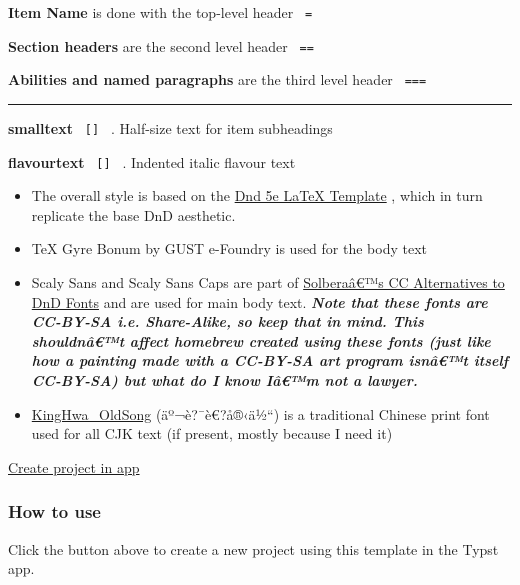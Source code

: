 \textbf{Item Name} is done with the top-level header \texttt{\ =\ }

\textbf{Section headers} are the second level header \texttt{\ ==\ }

\textbf{Abilities and named paragraphs} are the third level header
\texttt{\ ===\ }

\begin{center}\rule{0.5\linewidth}{0.5pt}\end{center}

\textbf{smalltext} \texttt{\ {[}{]}\ } . Half-size text for item
subheadings

\textbf{flavourtext} \texttt{\ {[}{]}\ } . Indented italic flavour text


\begin{itemize}
\tightlist
\item
  The overall style is based on the
  \href{https://github.com/rpgtex/DND-5e-LaTeX-Template}{Dnd 5e LaTeX
  Template} , which in turn replicate the base DnD aesthetic.
\item
  TeX Gyre Bonum by GUST e-Foundry is used for the body text
\item
  Scaly Sans and Scaly Sans Caps are part of
  \href{https://github.com/jonathonf/solbera-dnd-fonts}{Solberaâ€™s CC
  Alternatives to DnD Fonts} and are used for main body text.
  \emph{\textbf{Note that these fonts are CC-BY-SA i.e. Share-Alike, so
  keep that in mind. This shouldnâ€™t affect homebrew created using
  these fonts (just like how a painting made with a CC-BY-SA art program
  isnâ€™t itself CC-BY-SA) but what do I know Iâ€™m not a lawyer.}}
\item
  \href{https://zhuanlan.zhihu.com/p/637491623}{KingHwa\_OldSong}
  (äº¬è?¯è€?å®‹ä½``) is a traditional Chinese print font used for all
  CJK text (if present, mostly because I need it)
\end{itemize}

\href{/app?template=wenyuan-campaign&version=0.1.0}{Create project in
app}

\subsubsection{How to use}\label{how-to-use}

Click the button above to create a new project using this template in
the Typst app.

